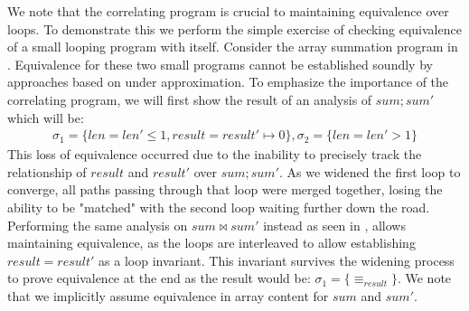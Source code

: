 We note that the correlating program is crucial to maintaining equivalence over loops. To demonstrate this we perform the simple exercise of checking equivalence of a small looping program with itself. Consider the array summation program in . Equivalence for these two small programs cannot be established soundly by approaches based on under approximation. To emphasize the importance of the correlating program, we will first show the result of an analysis of $sum;sum'$ which will be:
{\footnotesize
\[
\begin{array}{c}
\sigma_1 = \{len = len' \leq 1, result = result' \mapsto 0\},
\sigma_2 = \{len = len' > 1\}
\end{array}
\]
}
This loss of equivalence occurred due to the inability to precisely track the relationship of $result$ and $result'$ over $sum;sum'$. As we widened the first loop to converge, all paths passing through that loop were merged together, losing the ability to be "matched" with the second loop waiting further down the road. Performing the same analysis on $sum \bowtie sum'$ instead as seen in , allows maintaining equivalence, as the loops are interleaved to allow establishing $result = result'$ as a loop invariant. This invariant survives the widening process to prove equivalence at the end as the result would be:
{\footnotesize $\sigma_1 = \{\equiv_{result}\}$}.
We note that we implicitly assume equivalence in array content for $sum$ and $sum'$.

